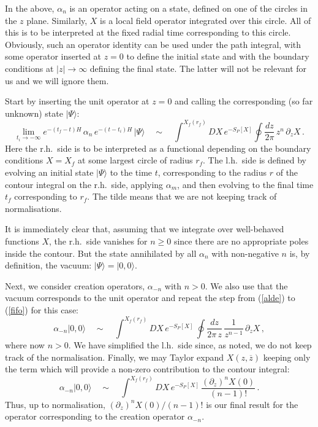 \documentclass[12pt]{article}
\newcommand{\be}{\begin{equation}}
\newcommand{\ee}{\end{equation}}
\newcommand{\ol}{\overline}
\numberwithin{equation}{section}
\begin{document}
In the above, $\alpha_n$ is an operator acting on a state, defined on one of the circles in the $z$ plane. Similarly, $X$ is a local field operator integrated over this circle. All of this is to be interpreted at the fixed radial time corresponding to this circle. Obviously, such an operator identity can be used under the path integral, with some operator inserted at $z=0$ to define the initial state and with the boundary conditions at $|z|\to\infty$ defining the final state. The latter will not be relevant for us and we will ignore them.

Start by inserting the unit operator at $z=0$ and calling the corresponding (so far unknown) state $|\Psi\rangle$:
\be
\lim_{t_i\to-\infty}e^{-(t_f-t)H}\,\alpha_n\,e^{-(t-t_i)H}\,|\Psi\rangle \quad\sim\quad  \int^{X_f(r_f)} DX\,e^{-S_P[X]}\oint\frac{dz}{2\pi}\,z^n\,\partial_z X\,.
\label{fifo}
\ee
Here the r.h.~side is to be interpreted as a functional depending on the boundary conditions $X=X_f$ at some largest circle of radius $r_f$. The l.h.~side is defined by evolving an initial state $|\Psi\rangle$ to the time $t$, corresponding to the radius $r$ of the contour integral on the r.h.~side, applying $\alpha_m$, and then evolving to the final time $t_f$ corresponding to $r_f$. The tilde means that we are not keeping track of normalisations.

It is immediately clear that, assuming that we integrate over well-behaved functions $X$, the r.h.~side vanishes for $n\ge 0$ since there are no appropriate poles inside the contour. But the state annihilated by all $\alpha_n$ with non-negative $n$ is, by definition, the vacuum: $|\Psi\rangle =|0,0\rangle$. 

Next, we consider creation operators, $\alpha_{-n}$ with $n>0$. We also use that the vacuum corresponds to the unit operator and repeat the step from (\ref{alde}) to (\ref{fifo}) for this case:
\be
\alpha_{-n}|0,0\rangle \quad\sim\quad  \int^{X_f(r_f)} DX\,e^{-S_P[X]}\,\oint\frac{dz}{2\pi \,z}\,\frac{1}{z^{n-1}}\,\partial_z X\,,
\ee
where now $n>0$. We have simplified the l.h.~side since, as noted, we do not keep track of the normalisation. Finally, we may Taylor expand $X(z,\ol{z})$ keeping only the term which will provide a non-zero contribution to the contour integral:
\be
\alpha_{-n}|0,0\rangle \quad\sim\quad  \int^{X_f(r_f)} DX\,e^{-S_P[X]}\,\frac{(\partial_z)^n X(0)}{(n-1)!}\,.
\ee
Thus, up to normalisation, $(\partial_z)^n X(0)/(n-1)!$ is our final result for the operator corresponding to the creation operator $\alpha_{-n}$.
\end{document}
